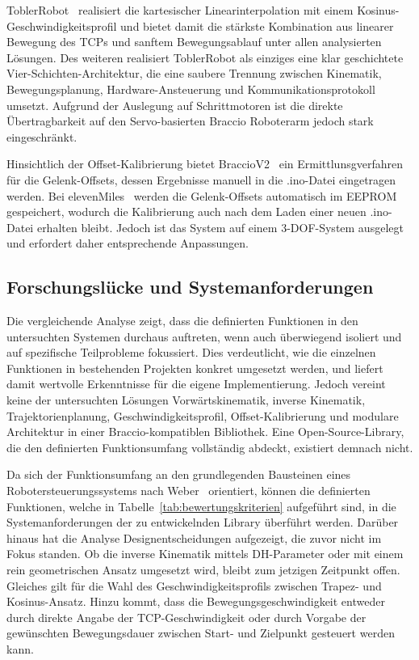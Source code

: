 \documentclass[12pt,a4paper]{article}
\begin{document}
ToblerRobot~\cite{KANCHANAKALANAPERERA.5172026} realisiert die kartesischer Linearinterpolation mit einem Kosinus-Ge\-schwin\-dig\-keits\-pro\-fil und bietet damit die stärkste Kombination aus linearer Bewegung des TCPs und sanftem Bewegungsablauf unter allen analysierten Lösungen. Des weiteren realisiert ToblerRobot als einziges eine klar geschichtete Vier-Schichten-Architektur, die eine saubere Trennung zwischen Kinematik, Bewegungsplanung, Hardware-Ansteuerung und Kommunikationsprotokoll umsetzt. Aufgrund der Auslegung auf Schrittmotoren ist die direkte Übertragbarkeit auf den Servo-basierten Braccio Roboterarm jedoch stark eingeschränkt. 

Hinsichtlich der Offset-Kalibrierung bietet BraccioV2~\cite{LukasSeveringhaus.2020} ein Ermittlunsgverfahren für die Gelenk-Offsets, dessen Ergebnisse manuell in die .ino-Datei eingetragen werden. Bei elevenMiles~\cite{elevenMiles.5172026} werden die Gelenk-Offsets automatisch im EEPROM gespeichert, wodurch die Kalibrierung auch nach dem Laden einer neuen .ino-Datei erhalten bleibt. Jedoch ist das System auf einem 3-DOF-System ausgelegt und erfordert daher entsprechende Anpassungen.


\subsection{Forschungslücke und Systemanforderungen}

Die vergleichende Analyse zeigt, dass die definierten Funktionen in den untersuchten Systemen durchaus auftreten, wenn auch überwiegend isoliert und auf spezifische Teilprobleme fokussiert. Dies verdeutlicht, wie die einzelnen Funktionen in bestehenden Projekten konkret umgesetzt werden, und liefert damit wertvolle Erkenntnisse für die eigene Implementierung. Jedoch vereint keine der untersuchten Lösungen Vorwärtskinematik, inverse Kinematik, Trajektorienplanung, Geschwindigkeitsprofil, Offset-Kalibrierung und modulare Architektur in einer Braccio-kompatiblen Bibliothek. Eine Open-Source-Library, die den definierten Funktionsumfang vollständig abdeckt, existiert demnach nicht.

Da sich der Funktionsumfang an den grundlegenden Bausteinen eines Robotersteuerungssystems nach Weber~\cite{Weber.2017} orientiert, können die definierten Funktionen, welche in Tabelle~\ref{tab:bewertungskriterien} aufgeführt sind, in die Systemanforderungen der zu entwickelnden Library überführt werden. Darüber hinaus hat die Analyse Designentscheidungen aufgezeigt, die zuvor nicht im Fokus standen. Ob die inverse Kinematik mittels DH-Parameter oder mit einem rein geometrischen Ansatz umgesetzt wird, bleibt zum jetzigen Zeitpunkt offen. Gleiches gilt für die Wahl des Geschwindigkeitsprofils zwischen Trapez- und Kosinus-Ansatz. Hinzu kommt, dass die Bewegungsgeschwindigkeit entweder durch direkte Angabe der TCP-Geschwindigkeit oder durch Vorgabe der gewünschten Bewegungsdauer zwischen Start- und Zielpunkt gesteuert werden kann.
\end{document}
